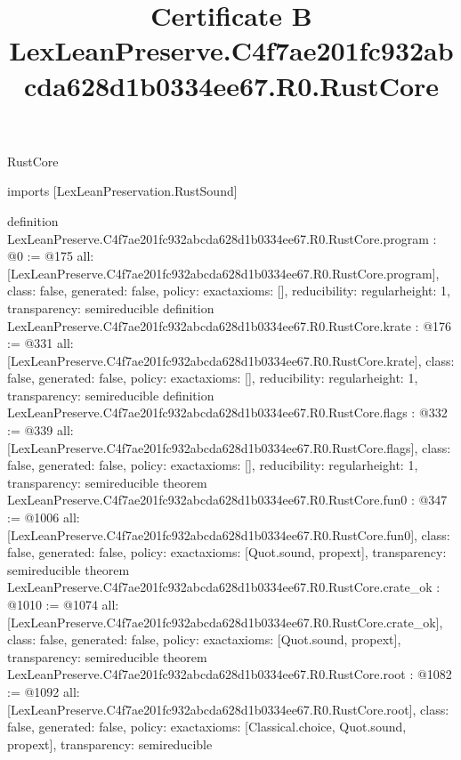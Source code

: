 \begin{lexlean}{RustCore}
\title{Certificate B LexLeanPreserve.C4f7ae201fc932abcda628d1b0334ee67.R0.RustCore}
\begin{coremodule}
imports [LexLeanPreservation.RustSound]

definition LexLeanPreserve.C4f7ae201fc932abcda628d1b0334ee67.R0.RustCore.program : @0 := @175 {
  all: [LexLeanPreserve.C4f7ae201fc932abcda628d1b0334ee67.R0.RustCore.program],
  class: false,
  generated: false,
  policy: exact{axioms: []},
  reducibility: regular{height: 1},
  transparency: semireducible
}
definition LexLeanPreserve.C4f7ae201fc932abcda628d1b0334ee67.R0.RustCore.krate : @176 := @331 {
  all: [LexLeanPreserve.C4f7ae201fc932abcda628d1b0334ee67.R0.RustCore.krate],
  class: false,
  generated: false,
  policy: exact{axioms: []},
  reducibility: regular{height: 1},
  transparency: semireducible
}
definition LexLeanPreserve.C4f7ae201fc932abcda628d1b0334ee67.R0.RustCore.flags : @332 := @339 {
  all: [LexLeanPreserve.C4f7ae201fc932abcda628d1b0334ee67.R0.RustCore.flags],
  class: false,
  generated: false,
  policy: exact{axioms: []},
  reducibility: regular{height: 1},
  transparency: semireducible
}
theorem LexLeanPreserve.C4f7ae201fc932abcda628d1b0334ee67.R0.RustCore.fun0 : @347 := @1006 {
  all: [LexLeanPreserve.C4f7ae201fc932abcda628d1b0334ee67.R0.RustCore.fun0],
  class: false,
  generated: false,
  policy: exact{axioms: [Quot.sound, propext]},
  transparency: semireducible
}
theorem LexLeanPreserve.C4f7ae201fc932abcda628d1b0334ee67.R0.RustCore.crate_ok : @1010 := @1074 {
  all: [LexLeanPreserve.C4f7ae201fc932abcda628d1b0334ee67.R0.RustCore.crate_ok],
  class: false,
  generated: false,
  policy: exact{axioms: [Quot.sound, propext]},
  transparency: semireducible
}
theorem LexLeanPreserve.C4f7ae201fc932abcda628d1b0334ee67.R0.RustCore.root : @1082 := @1092 {
  all: [LexLeanPreserve.C4f7ae201fc932abcda628d1b0334ee67.R0.RustCore.root],
  class: false,
  generated: false,
  policy: exact{axioms: [Classical.choice, Quot.sound, propext]},
  transparency: semireducible
}


\end{coremodule}
\end{lexlean}
